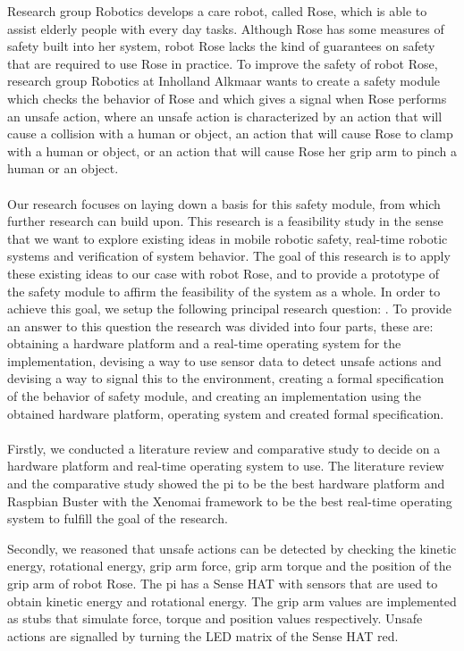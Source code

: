 \documentclass[12pt]{scrreprt}
\begin{document}
Research group Robotics develops a care robot, called Rose, which is able to assist elderly people with every day tasks. Although Rose has some measures of safety built into her system, robot Rose lacks the kind of guarantees on safety that are required to use Rose in practice. To improve the safety of robot Rose, research group Robotics at Inholland Alkmaar wants to create a safety module which checks the behavior of Rose and which gives a signal when Rose performs an unsafe action, where an unsafe action is characterized by an action that will cause a collision with a human or object, an action that will cause Rose to clamp with a human or object, or an action that will cause Rose her grip arm to pinch a human or an object.
\\\\
Our research focuses on laying down a basis for this safety module, from which further research can build upon. This research is a feasibility study in the sense that we want to explore existing ideas in mobile robotic safety, real-time robotic systems and verification of system behavior. The goal of this research is to apply these existing ideas to our case with robot Rose, and to provide a prototype of the safety module to affirm the feasibility of the system as a whole. In order to achieve this goal, we setup the following principal research question: \textit{\mq}. To provide an answer to this question the research was divided into four parts, these are: obtaining a hardware platform and a real-time operating system for the implementation, devising a way to use sensor data to detect unsafe actions and devising a way to signal this to the environment, creating a formal specification of the behavior of safety module, and creating an implementation using the obtained hardware platform, operating system and created formal specification.
\\\\
Firstly, we conducted a literature review and comparative study to decide on a hardware platform and real-time operating system to use. The literature review and the comparative study showed the \gls{pi} to be the best hardware platform and Raspbian Buster with the Xenomai framework to be the best real-time operating system to fulfill the goal of the research.
\par
Secondly, we reasoned that unsafe actions can be detected by checking the kinetic energy, rotational energy, grip arm force, grip arm torque and the position of the grip arm of robot Rose. The \gls{pi} has a Sense HAT with sensors that are used to obtain kinetic energy and rotational energy. The grip arm values are implemented as stubs that simulate force, torque and position values respectively. Unsafe actions are signalled by turning the LED matrix of the Sense HAT red.
\end{document}
